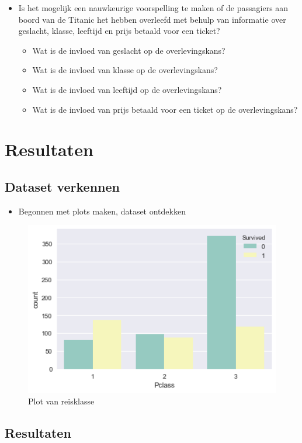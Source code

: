 \documentclass[11pt]{article}
\begin{document}
\begin{itemize}
\item Is het mogelijk een nauwkeurige voorspelling te maken of de passagiers aan boord van de Titanic het hebben overleefd met behulp van informatie over geslacht, klasse, leeftijd en prijs betaald voor een ticket? 
\begin{itemize}
\item Wat is de invloed van geslacht op de overlevingskans?
\item Wat is de invloed van klasse op de overlevingskans?
\item Wat is de invloed van leeftijd op de overlevingskans?
\item Wat is de invloed van prijs betaald voor een ticket op de overlevingskans?
\end{itemize}
\end{itemize}

\section*{Resultaten}
\label{sec:orgaa1723a}
\subsection*{Dataset verkennen}
\label{sec:org0948277}

\begin{itemize}
\item Begonnen met plots maken, dataset ontdekken
\end{itemize}


\begin{figure}[htbp]
\centering
\includegraphics[width=600]{./ClassCount.png}
\caption{Plot van reisklasse}
\end{figure}

\subsection*{Resultaten}
\label{sec:orgc44b7c1}
\end{document}
